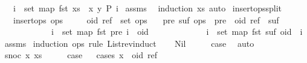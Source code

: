 \begin{isabellebody}
\ \ \ {\isachardoublequoteopen}{\isasymforall}i\ {\isasymin}\ set\ {\isacharparenleft}map\ fst\ {\isacharparenleft}xs\ {\isacharat}\ {\isacharbrackleft}{\isacharparenleft}x{\isacharcomma}\ y{\isacharparenright}{\isacharbrackright}{\isacharparenright}{\isacharparenright}{\isachardot}\ P\ i{\isachardoublequoteclose}\isanewline
%
\isadelimproof
%
\endisadelimproof
%
\isatagproof
{}\isamarkupfalse%
\ assms\ \isamarkupfalse%
\ {\isacharparenleft}induction\ xs{\isacharcomma}\ auto{\isacharparenright}%
\endisatagproof
{\isafoldproof}%
%
\isadelimproof
\isanewline
%
\endisadelimproof
\isanewline
{}\isamarkupfalse%
\ insert{\isacharunderscore}ops{\isacharunderscore}split{\isacharcolon}\isanewline
\ \ \ {\isachardoublequoteopen}insert{\isacharunderscore}ops\ ops{\isachardoublequoteclose}\isanewline
\ \ \ \ \ {\isachardoublequoteopen}{\isacharparenleft}oid{\isacharcomma}\ ref{\isacharparenright}\ {\isasymin}\ set\ ops{\isachardoublequoteclose}\isanewline
\ \ \ {\isachardoublequoteopen}{\isasymexists}pre\ suf{\isachardot}\ ops\ {\isacharequal}\ pre\ {\isacharat}\ {\isacharbrackleft}{\isacharparenleft}oid{\isacharcomma}\ ref{\isacharparenright}{\isacharbrackright}\ {\isacharat}\ suf\ {\isasymand}\isanewline
\ \ \ \ \ \ \ \ \ \ \ \ {\isacharparenleft}{\isasymforall}i\ {\isasymin}\ set\ {\isacharparenleft}map\ fst\ pre{\isacharparenright}{\isachardot}\ i\ {\isacharless}\ oid{\isacharparenright}\ {\isasymand}\isanewline
\ \ \ \ \ \ \ \ \ \ \ \ {\isacharparenleft}{\isasymforall}i\ {\isasymin}\ set\ {\isacharparenleft}map\ fst\ suf{\isacharparenright}{\isachardot}\ oid\ {\isacharless}\ i{\isacharparenright}{\isachardoublequoteclose}\isanewline
%
\isadelimproof
%
\endisadelimproof
%
\isatagproof
{}\isamarkupfalse%
\ assms\ \isamarkupfalse%
{\isacharparenleft}induction\ ops\ rule{\isacharcolon}\ List{\isachardot}rev{\isacharunderscore}induct{\isacharparenright}\isanewline
\ \ \isamarkupfalse%
\ Nil\isanewline
\ \ \isamarkupfalse%
\ \isamarkupfalse%
\ {\isacharquery}case\ \isamarkupfalse%
\ auto\isanewline
{}\isamarkupfalse%
\isanewline
\ \ \isamarkupfalse%
\ {\isacharparenleft}snoc\ x\ xs{\isacharparenright}\isanewline
\ \ \isamarkupfalse%
\ \isamarkupfalse%
\ {\isacharquery}case\isanewline
\ \ \isamarkupfalse%
{\isacharparenleft}cases\ {\isachardoublequoteopen}x\ {\isacharequal}\ {\isacharparenleft}oid{\isacharcomma}\ ref{\isacharparenright}{\isachardoublequoteclose}{\isacharparenright}\isanewline

\end{isabellebody}
